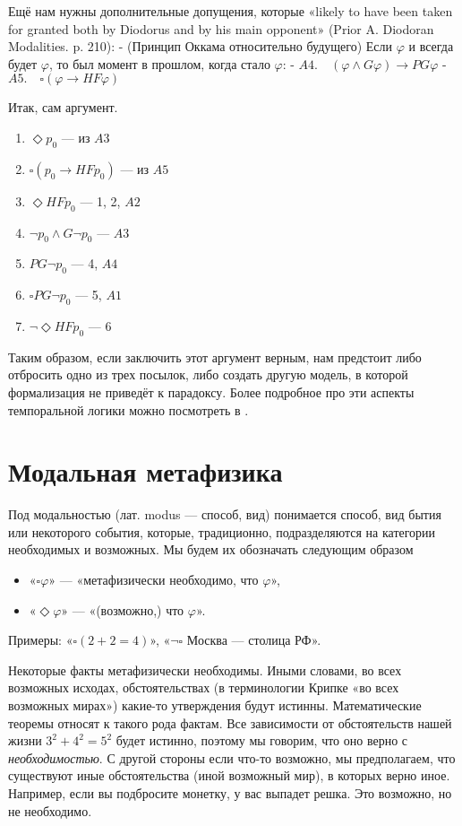 \documentclass[openany]{book}
\theoremstyle{plain}
\theoremstyle{definition}
\begin{document}
Ещё нам нужны дополнительные допущения, которые «likely to have been taken for granted both by Diodorus and by his main opponent» (Prior A. Diodoran Modalities. p. 210):
- (Принцип Оккама относительно будущего) Если \(\varphi\) и всегда будет \(\varphi\), то был момент в прошлом, когда стало \(\varphi\):
    - \(A4. \quad (\varphi \land G \varphi) \to PG\varphi\) 
- \(A5. \quad \square(\varphi \to HF \varphi)\)

Итак, сам аргумент.
\begin{enumerate}
\item \(\Diamond p_0\) — из \(A3\)
\item \(\square(p_0 \to HF p_0)\) — из \(A5\)
\item \(\Diamond HF p_0\) — 1, 2, \(A2\)
\item \(\neg p_0 \land G \neg p_0\) — \(A3\)
\item \(PG \neg p_0\) — 4, \(A4\)
\item \(\square PG \neg p_0\) — 5, \(A1\)
\item \(\neg \Diamond HF p_0\) — 6
\end{enumerate}

Таким образом, если заключить этот аргумент верным, нам предстоит либо отбросить одно из трех посылок, либо создать другую модель, в которой формализация не приведёт к парадоксу. Более подробное про эти аспекты темпоральной логики можно посмотреть в \cite{Goranko}.

\chapter{ Модальная метафизика }

Под модальностью (лат. modus --- способ, вид) понимается способ, вид бытия или некоторого события, которые, традиционно, подразделяются на категории необходимых и возможных. Мы будем их обозначать следующим образом
\begin{itemize}
\item «\(\square \varphi\)» — «метафизически необходимо, что \(\varphi\)»,
\item «\(\Diamond \varphi\)» — «(возможно,) что \(\varphi\)».
\end{itemize}

Примеры: «\(\square (2+2=4)\)», «\(\neg \square\) Москва — столица РФ».

Некоторые факты метафизически необходимы. Иными словами, во всех возможных исходах, обстоятельствах (в терминологии Крипке «во всех возможных мирах») какие-то утверждения будут истинны. Математические теоремы относят к такого рода фактам. Все зависимости от обстоятельств нашей жизни \(3^2 + 4^2 = 5^2\) будет истинно, поэтому мы говорим, что оно верно с \textit{необходимостью}. С другой стороны если что-то возможно, мы предполагаем, что существуют иные обстоятельства (иной возможный мир), в которых верно иное. Например, если вы подбросите монетку, у вас выпадет решка. Это возможно, но не необходимо.
\end{document}
